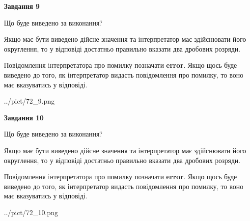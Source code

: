 \documentclass[12pt, ukrainian]{article}
\begin{document}
{\begin {Large}
{\begin {center}\textbf{Завдання 9}\end {center}}\par
Що буде виведено за виконання? \par

Якщо має бути виведено дійсне значення та інтерпретатор має здійснювати його округлення, 
то у відповіді достатньо правильно вказати два дробових розряди.

Повідомлення інтерпретатора про помилку позначати \textbf{error}.
Якщо щось буде виведено до того, як інтерпретатор видасть повідомлення про помилку, 
то воно має вказуватись у відповіді. \par

\begin{center}
	{../pict/72_9.png}
\end{center}
\newpage

{\begin {center}\textbf{Завдання 10}\end {center}}\par
Що буде виведено за виконання? \par

Якщо має бути виведено дійсне значення та інтерпретатор має здійснювати його округлення, 
то у відповіді достатньо правильно вказати два дробових розряди.

Повідомлення інтерпретатора про помилку позначати \textbf{error}.
Якщо щось буде виведено до того, як інтерпретатор видасть повідомлення про помилку, 
то воно має вказуватись у відповіді. \par

\begin{center}
	{../pict/72_10.png}
\end{center}
\newpage

\end {Large}}
\end{document}

